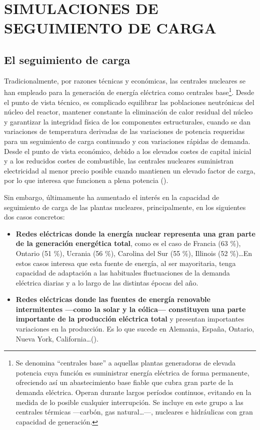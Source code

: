 \newpage
\section{SIMULACIONES DE SEGUIMIENTO DE CARGA} \label{simulaciones_seguimiento_de_carga}

\subsection{El seguimiento de carga} \label{seguimiento_de_carga}

Tradicionalmente, por razones técnicas y económicas, las centrales nucleares se han empleado para la generación de energía eléctrica como centrales base\footnote{Se denomina ``centrales base'' a aquellas plantas generadoras de elevada potencia cuya función es suministrar energía eléctrica de forma permanente, ofreciendo así un abastecimiento base fiable que cubra gran parte de la demanda eléctrica. Operan durante largos períodos continuos, evitando en la medida de lo posible cualquier interrupción. Se incluye en este grupo a las centrales térmicas ---carbón, gas natural\dots---, nucleares e hidráulicas con gran capacidad de generación.}. Desde el punto de vista técnico, es complicado equilibrar las poblaciones neutrónicas del núcleo del reactor, mantener constante la eliminación de calor residual del núcleo y garantizar la integridad física de los componentes estructurales, cuando se dan variaciones de temperatura derivadas de las variaciones de potencia requeridas para un seguimiento de carga continuado y con variaciones rápidas de demanda. Desde el punto de vista económico, debido a los elevados costes de capital inicial y a los reducidos costes de combustible, las centrales nucleares suministran electricidad al menor precio posible cuando mantienen un elevado \gls{factor de carga}, por lo que interesa que funcionen a plena potencia (\cite{stanford_load_following}).

Sin embargo, últimamente ha aumentado el interés en la capacidad de seguimiento de carga de las plantas nucleares, principalmente, en los siguientes dos casos concretos:

\begin{itemize}
  \item \textbf{Redes eléctricas donde la energía nuclear representa una gran parte de la generación energética total}, como es el caso de Francia (63 \%), Ontario (51 \%), Ucrania (56 \%), Carolina del Sur (55 \%), Illinois (52 \%)\dots  En estos casos interesa que esta fuente de energía, al ser mayoritaria, tenga capacidad de adaptación a las habituales fluctuaciones de la demanda eléctrica diarias y a lo largo de las distintas épocas del año.
  \item \textbf{Redes eléctricas donde las fuentes de energía renovable intermitentes ---como la solar y la eólica--- constituyen una parte importante de la producción eléctrica total} y presentan importantes variaciones en la producción. Es lo que sucede en Alemania, España, Ontario, Nueva York, California\dots (\cite{ANS_2019}).
\end{itemize} 

